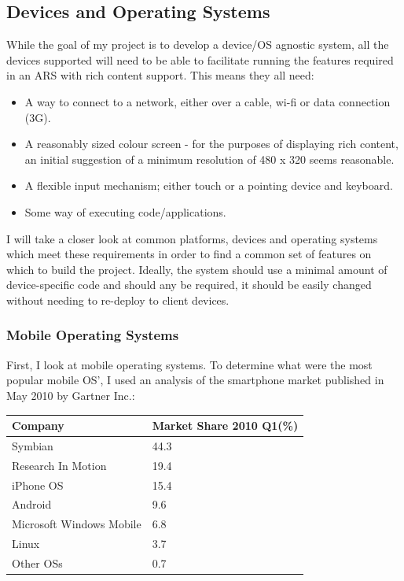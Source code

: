 \documentclass[a4papert,11pt,notitlepage]{ltxdoc}
\begin{document}
\subsection{Devices and Operating Systems}
\label{sec:devices}
While the goal of my project is to develop a device/OS agnostic system, all the devices supported will need to be able to facilitate running the features required in an ARS with rich content support. This means they all need:
\begin{itemize}
\item A way to connect to a network, either over a cable, wi-fi or data connection (3G).
\item A reasonably sized colour screen - for the purposes of displaying rich content, an initial suggestion of a minimum resolution of 480 x 320 seems reasonable.
\item A flexible input mechanism; either touch or a pointing device and keyboard.
\item Some way of executing code/applications.
\end{itemize}

I will take a closer look at common platforms, devices and operating systems which meet these requirements in order to find a common set of features on which to build the project. Ideally, the system should use a minimal amount of device-specific code and should any be required, it should be easily changed without needing to re-deploy to client devices.

\subsubsection{Mobile Operating Systems}
First, I look at mobile operating systems. To determine what were the most popular mobile OS', I used an analysis of the smartphone market published in May 2010 by Gartner Inc.\cite{gartner:mobile}:

\begin{tabular}{l l}
Company & Market Share 2010 Q1(\%) \\
\hline
Symbian & 44.3 \\
Research In Motion & 19.4 \\
iPhone OS & 15.4 \\
Android & 9.6 \\
Microsoft Windows Mobile & 6.8 \\
Linux & 3.7 \\
Other OSs & 0.7 \\
\end{tabular}
\end{document}
